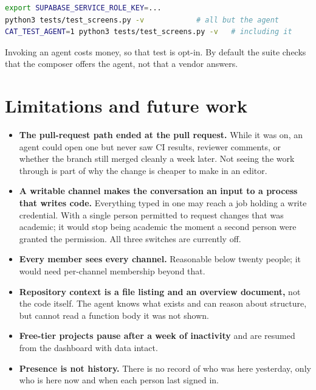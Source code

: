 \documentclass[11pt,letterpaper]{article}
\begin{document}
\begin{lstlisting}[language=bash]
export SUPABASE_SERVICE_ROLE_KEY=...
python3 tests/test_screens.py -v            # all but the agent
CAT_TEST_AGENT=1 python3 tests/test_screens.py -v   # including it
\end{lstlisting}

Invoking an agent costs money, so that test is opt-in. By default the suite
checks that the composer offers the agent, not that a vendor answers.

\section{Limitations and future work}

\begin{itemize}
  \item \textbf{The pull-request path ended at the pull request.} While it was
    on, an agent could open one but never saw CI results, reviewer comments, or
    whether the branch still merged cleanly a week later. Not seeing the work
    through is part of why the change is cheaper to make in an editor.
  \item \textbf{A writable channel makes the conversation an input to a
    process that writes code.} Everything typed in one may reach a job holding
    a write credential. With a single person permitted to request changes that
    was academic; it would stop being academic the moment a second person were
    granted the permission. All three switches are currently off.
  \item \textbf{Every member sees every channel.} Reasonable below twenty
    people; it would need per-channel membership beyond that.
  \item \textbf{Repository context is a file listing and an overview document,}
    not the code itself. The agent knows what exists and can reason about
    structure, but cannot read a function body it was not shown.
  \item \textbf{Free-tier projects pause after a week of inactivity} and are
    resumed from the dashboard with data intact.
  \item \textbf{Presence is not history.} There is no record of who was here
    yesterday, only who is here now and when each person last signed in.
\end{itemize}
\end{document}
